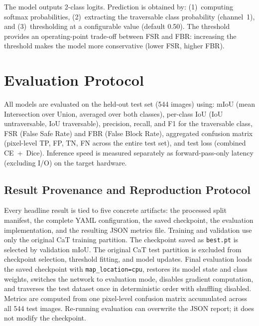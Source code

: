 \documentclass[12pt,a4paper]{report}
\begin{document}
The model outputs 2-class logits. Prediction is obtained by:
(1)~computing softmax probabilities,
(2)~extracting the traversable class probability (channel~1), and
(3)~thresholding at a configurable value (default 0.50).
The threshold provides an operating-point trade-off between FSR and FBR: increasing the threshold makes the model more conservative (lower FSR, higher FBR).

\section{Evaluation Protocol}

All models are evaluated on the held-out test set (544 images) using:
mIoU (mean Intersection over Union, averaged over both classes),
per-class IoU (IoU untraversable, IoU traversable),
precision, recall, and F1 for the traversable class,
FSR (False Safe Rate) and FBR (False Block Rate),
aggregated confusion matrix (pixel-level TP, FP, TN, FN across the entire test set),
and test loss (combined CE~+~Dice).
Inference speed is measured separately as forward-pass-only latency (excluding I/O) on the target hardware.

\subsection{Result Provenance and Reproduction Protocol}
\label{sec:result_provenance}

Every headline result is tied to five concrete artifacts: the processed split
manifest, the complete YAML configuration, the saved checkpoint, the evaluation
implementation, and the resulting JSON metrics file.  Training and validation
use only the original CaT training partition.  The checkpoint saved as
\texttt{best.pt} is selected by validation mIoU.  The original CaT test
partition is excluded from checkpoint selection, threshold fitting, and model
updates.  Final evaluation loads the saved checkpoint with
\texttt{map\_location=cpu}, restores its model state and class weights, switches
the network to evaluation mode, disables gradient computation, and traverses
the test dataset once in deterministic order with shuffling disabled.  Metrics
are computed from one pixel-level confusion matrix accumulated across all 544
test images.  Re-running evaluation can overwrite the JSON report; it does not
modify the checkpoint.
\end{document}
